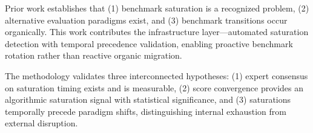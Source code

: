 
Prior work establishes that (1) benchmark saturation is a recognized problem, (2) alternative evaluation paradigms exist, and (3) benchmark transitions occur organically. This work contributes the infrastructure layer---automated saturation detection with temporal precedence validation, enabling proactive benchmark rotation rather than reactive organic migration.


The methodology validates three interconnected hypotheses: (1) expert consensus on saturation timing exists and is measurable, (2) score convergence provides an algorithmic saturation signal with statistical significance, and (3) saturations temporally precede paradigm shifts, distinguishing internal exhaustion from external disruption.
